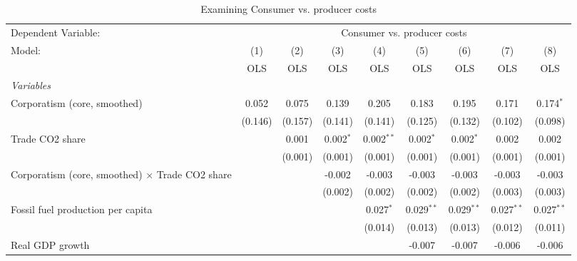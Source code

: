 
\begin{table}[htbp]
   \caption{Examining Consumer vs. producer costs}
   \centering
   \begin{tabular}{lcccccccc}
      \toprule
      Dependent Variable: & \multicolumn{8}{c}{Consumer vs. producer costs}\\
      Model:                                                 & (1)     & (2)     & (3)         & (4)          & (5)          & (6)          & (7)          & (8)\\  
                                                             &  OLS    & OLS     & OLS         & OLS          & OLS          & OLS          & OLS          & OLS\\  
      \midrule
      \emph{Variables}\\
      Corporatism (core, smoothed)                           & 0.052   & 0.075   & 0.139       & 0.205        & 0.183        & 0.195        & 0.171        & 0.174$^{*}$\\   
                                                             & (0.146) & (0.157) & (0.141)     & (0.141)      & (0.125)      & (0.132)      & (0.102)      & (0.098)\\   
      Trade CO2 share                                        &         & 0.001   & 0.002$^{*}$ & 0.002$^{**}$ & 0.002$^{*}$  & 0.002$^{*}$  & 0.002        & 0.002\\   
                                                             &         & (0.001) & (0.001)     & (0.001)      & (0.001)      & (0.001)      & (0.001)      & (0.001)\\   
      Corporatism (core, smoothed) $\times$ Trade CO2 share  &         &         & -0.002      & -0.003       & -0.003       & -0.003       & -0.003       & -0.003\\   
                                                             &         &         & (0.002)     & (0.002)      & (0.002)      & (0.002)      & (0.003)      & (0.003)\\   
      Fossil fuel production per capita                      &         &         &             & 0.027$^{*}$  & 0.029$^{**}$ & 0.029$^{**}$ & 0.027$^{**}$ & 0.027$^{**}$\\   
                                                             &         &         &             & (0.014)      & (0.013)      & (0.013)      & (0.012)      & (0.011)\\   
      Real GDP growth                                        &         &         &             &              & -0.007       & -0.007       & -0.006       & -0.006\\   

\end{tabular}
\end{table}
